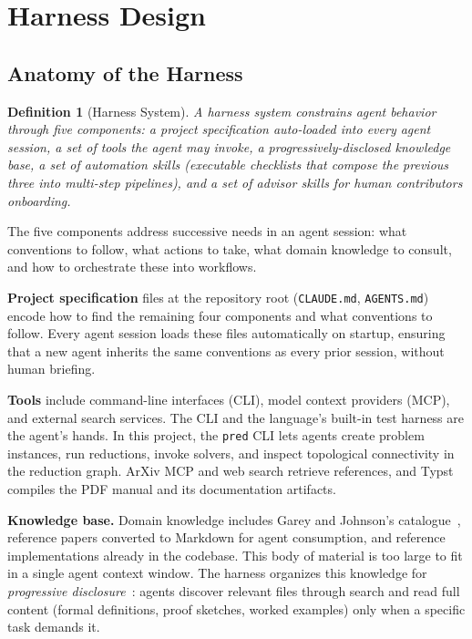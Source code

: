 \documentclass{article}
\newtheorem{definition}{Definition}
\begin{document}
\section{Harness Design}\label{sec:method}

\subsection{Anatomy of the Harness}\label{sec:skills}

\begin{definition}[Harness System]
A \emph{harness system} constrains agent behavior through five components: a project specification auto-loaded into every agent session, a set of tools the agent may invoke, a progressively-disclosed knowledge base, a set of automation skills (executable checklists that compose the previous three into multi-step pipelines), and a set of advisor skills for human contributors onboarding.
\end{definition}

The five components address successive needs in an agent session: what conventions to follow, what actions to take, what domain knowledge to consult, and how to orchestrate these into workflows.

\textbf{Project specification} files at the repository root (\texttt{CLAUDE.md}, \texttt{AGENTS.md}) encode how to find the remaining four components and what conventions to follow.
Every agent session loads these files automatically on startup, ensuring that a new agent inherits the same conventions as every prior session, without human briefing.

\textbf{Tools} include command-line interfaces (CLI), model context providers (MCP), and external search services.
The CLI and the language's built-in test harness are the agent's hands.
In this project, the \texttt{pred} CLI lets agents create problem instances, run reductions, invoke solvers, and inspect topological connectivity in the reduction graph.
ArXiv MCP and web search retrieve references, and Typst compiles the PDF manual and its documentation artifacts.

\textbf{Knowledge base.}
Domain knowledge includes Garey and Johnson's catalogue~\cite{garey1979}, reference papers converted to Markdown for agent consumption, and reference implementations already in the codebase.
This body of material is too large to fit in a single agent context window.
The harness organizes this knowledge for \emph{progressive disclosure}~\cite{Nielsen2006ProgressiveDisclosure}: agents discover relevant files through search and read full content (formal definitions, proof sketches, worked examples) only when a specific task demands it.
\end{document}
